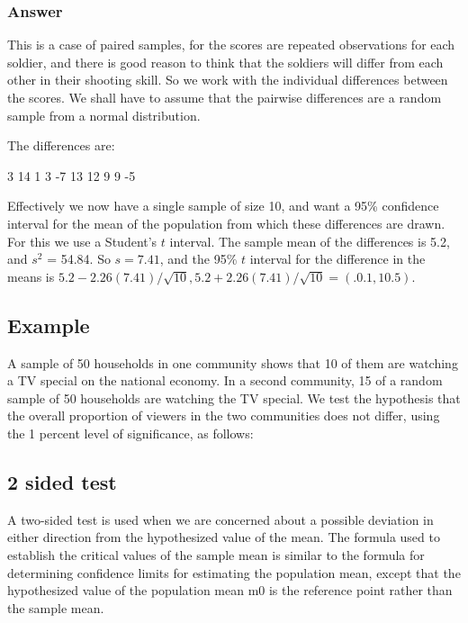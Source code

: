 \documentclass[12pt, a4paper]{report}
\theoremstyle{plain}
\theoremstyle{definition}
\theoremstyle{remark}
\begin{document}
\subsubsection{Answer}


This is a case of paired samples, for the scores are repeated observations for each
soldier, and there is good reason to think that the soldiers will differ from each other
in their shooting skill. So we work with the individual differences between the scores.
We shall have to assume that the pairwise differences are a random sample from a
normal distribution.

The differences are:

3 14 1 3 -7 13 12 9 9 -5


Effectively we now have a single sample of size 10, and want a 95\% confidence
interval for the mean of the population from which these differences are drawn. For
this we use a Student's $t$ interval. The sample mean of the differences is 5.2, and
$s^2$ = 54.84. So $s = 7.41$, and the 95\% $t$ interval for the difference in the means is
$5.2 - 2.26(7.41)/\sqrt{10},  5.2 + 2.26(7.41)/\sqrt{10} = (.0.1, 10.5)$.

\subsection{Example} A sample of 50 households in one community
shows that 10 of them are watching a TV special on the national
economy. In a second community, 15 of a random sample of 50
households are watching the TV special. We test the hypothesis
that the overall proportion of viewers in the two communities does
not differ, using the 1 percent level of significance, as follows:

\subsection{2 sided test}
A two-sided test is used when we are concerned about a possible
deviation in either direction from the hypothesized value of the
mean. The formula used to establish the critical values of the
sample mean is similar to the formula for determining confidence
limits for estimating the population mean, except that the
hypothesized value of the population mean m0 is the reference
point rather than the sample mean.







%
\end{document}
